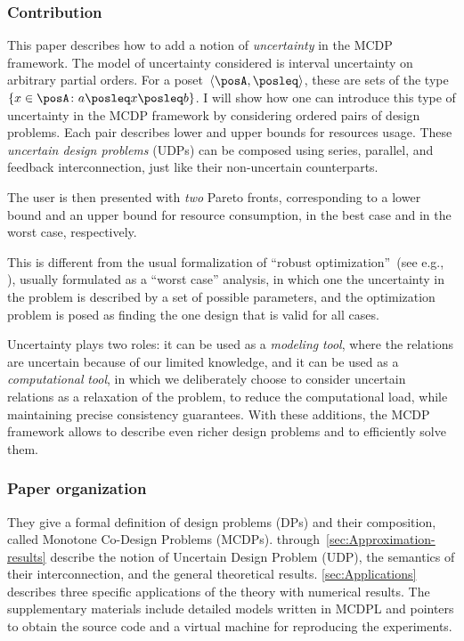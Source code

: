 \subsubsection*{Contribution}

This paper describes how to add a notion of \emph{uncertainty} in
the MCDP framework.
The model of uncertainty considered is interval
uncertainty on arbitrary partial orders.
For a poset~$\left\langle \posA,\posleq\right\rangle $,
these are sets of the type~$\{x\in\posA\colon a\posleq x\posleq b\}$.
I will show how one can introduce this type of uncertainty in the
MCDP framework by considering ordered pairs of design problems.
Each
pair describes lower and upper bounds for resources usage.
These \emph{uncertain
design problems} (UDPs) can be composed using series, parallel, and
feedback interconnection, just like their non-uncertain counterparts.

The user is then presented with \emph{two} Pareto fronts, corresponding
to a lower bound and an upper bound for resource consumption, in the
best case and in the worst case, respectively.

This is different from the usual formalization of ``robust optimization''~(see
e.g., \cite{bertsimas11theory,ben-tal09}), usually formulated as
a ``worst case'' analysis, in which one the uncertainty in the problem
is described by a set of possible parameters, and the optimization
problem is posed as finding the one design that is valid for all cases.

Uncertainty plays two roles: it can be used as a \emph{modeling} \emph{tool},
where the relations are uncertain because of our limited knowledge,
and it can be used as a \emph{computational} \emph{tool}, in which
we deliberately choose to consider uncertain relations as a relaxation
of the problem, to reduce the computational load, while maintaining
precise consistency guarantees. With these additions, the MCDP framework
allows to describe even richer design problems and to efficiently
solve them.


\subsubsection*{Paper organization}


They give a formal definition of design problems
(DPs) and their composition, called Monotone Co-Design Problems (MCDPs).
 through~\cref{sec:Approximation-results}
describe the notion of Uncertain Design Problem (UDP), the semantics
of their interconnection, and the general theoretical results. \cref{sec:Applications}
describes three specific applications of the theory with numerical
results. The supplementary materials include detailed models written
in MCDPL and pointers to obtain the source code and a virtual machine
for reproducing the experiments.


